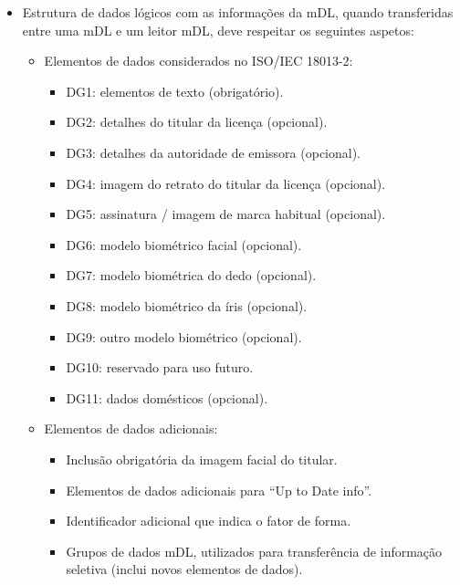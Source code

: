 \begin{itemize}
	\item Estrutura de dados lógicos com as informações da mDL, quando transferidas entre uma mDL e um leitor mDL, deve respeitar os seguintes aspetos:
	\begin{itemize}
		\item Elementos de dados considerados no ISO/IEC 18013-2:
		\begin{itemize}
			\item DG1: elementos de texto (obrigatório).
			\item DG2: detalhes do titular da licença (opcional).
			\item DG3: detalhes da autoridade de emissora (opcional).
			\item DG4: imagem do retrato do titular da licença (opcional).
			\item DG5: assinatura / imagem de marca habitual (opcional).
			\item DG6: modelo biométrico facial (opcional).
			\item DG7: modelo biométrica do dedo (opcional).
			\item DG8: modelo biométrico da íris (opcional).
			\item DG9: outro modelo biométrico (opcional).
			\item DG10: reservado para uso futuro.
			\item DG11: dados domésticos (opcional).
		\end{itemize}

		\item Elementos de dados adicionais:
		\begin{itemize}
			\item Inclusão obrigatória da imagem facial do titular.
			\item Elementos de dados adicionais para ``Up to Date info''.
			\item Identificador adicional que indica o fator de forma.
			\item Grupos de dados mDL, utilizados para transferência de informação seletiva (inclui novos elementos de dados).
		\end{itemize}
	\end{itemize}


\end{itemize}
